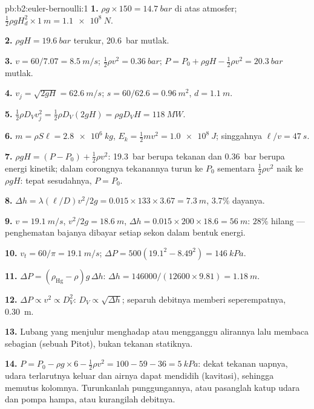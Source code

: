 \begin{solution}{pb:b2:euler-bernoulli:1}
\textbf{1.} $\rho g \times 150 = \qty{14.7}{bar}$ di atas atmosfer; $\tfrac12\rho gH_d^2
\times \qty{1}{m} = \qty{1.1e8}{N}$.

\textbf{2.} $\rho gH = \qty{19.6}{bar}$ terukur, \qty{20.6}{bar} mutlak.

\textbf{3.} $v = 60/7.07 = \qty{8.5}{m/s}$; $\tfrac12\rho v^2 = \qty{0.36}{bar}$; $P =
P_0 + \rho gH - \tfrac12\rho v^2 = \qty{20.3}{bar}$ mutlak.

\textbf{4.} $v_j = \sqrt{2gH} = \qty{62.6}{m/s}$; $s = 60/62.6 = \qty{0.96}{m^2}$, $d =
\qty{1.1}{m}$.

\textbf{5.} $\tfrac12\rho D_Vv_j^2 = \tfrac12\rho D_V(2gH) = \rho gD_VH = \qty{118}{MW}$.

\textbf{6.} $m = \rho S\ell = \qty{2.8e6}{kg}$, $E_k = \tfrac12mv^2 = \qty{1.0e8}{J}$;
singgahnya $\ell/v = \qty{47}{s}$.

\textbf{7.} $\rho gH = (P - P_0) + \tfrac12\rho v^2$: \qty{19.3}{bar} berupa tekanan
dan \qty{0.36}{bar} berupa energi kinetik; dalam corongnya tekanannya turun
ke $P_0$ sementara $\tfrac12\rho v^2$ naik ke $\rho gH$: tepat sesudahnya, $P = P_0$.

\textbf{8.} $\Delta h = \lambda(\ell/D)v^2/2g = 0.015 \times 133 \times 3.67 = \qty{7.3}{m}$,
$3.7\%$ dayanya.

\textbf{9.} $v = \qty{19.1}{m/s}$, $v^2/2g = \qty{18.6}{m}$, $\Delta h = 0.015 \times 200 \times
18.6 = \qty{56}{m}$: $28\%$ hilang --- penghematan bajanya dibayar setiap
sekon dalam bentuk energi.

\textbf{10.} $v_t = 60/\pi = \qty{19.1}{m/s}$; $\Delta P = 500(19.1^2 - 8.49^2) =
\qty{146}{kPa}$.

\textbf{11.} $\Delta P = (\rho_{\text{Hg}} - \rho)g\,\Delta h$: $\Delta h = 146000/(12600
\times 9.81) = \qty{1.18}{m}$.

\textbf{12.} $\Delta P \propto v^2 \propto D_V^2$: $D_V \propto \sqrt{\Delta h}$; separuh
debitnya memberi seperempatnya, \qty{0.30}{m}.

\textbf{13.} Lubang yang menjulur menghadap atau mengganggu alirannya lalu membaca
sebagian  (sebuah Pitot), bukan tekanan statiknya.

\textbf{14.} $P = P_0 - \rho g \times 6 - \tfrac12\rho v^2 = 100 - 59 - 36 = \qty{5}{kPa}$:
dekat tekanan uapnya, udara terlarutnya keluar dan airnya dapat
mendidih (kavitasi), sehingga memutus kolomnya. Turunkanlah punggungannya, atau pasanglah katup
udara dan pompa hampa, atau kurangilah debitnya.


\end{solution}
